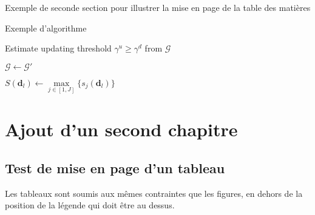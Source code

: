 \documentclass[letterpaper%
, twoside%
, 12pt%
,these%
,french
,creativecommons,hyperref,withAlgo2e%
]{thETS}
\begin{document}
Exemple de seconde section pour illustrer la mise en page de la table des matières

\begin{algorithm}[!h]

\caption{Exemple d'algorithme}
	
	


Estimate updating threshold $\gamma^u \geq \gamma^d$ from $\mathcal G$

$\mathcal G \leftarrow \mathcal G'$

	
	$S(\textbf{d}_l) \leftarrow \max\limits_{j \in [1,J]}\{s_j(\textbf{d}_l)\}$
	
\end{algorithm}

\chapter{Ajout d'un second chapitre}

\section{Test de mise en page d'un tableau}

Les tableaux sont soumis aux mêmes contraintes que les figures, en dehors de la position de la légende qui doit être au dessus.
\end{document}
